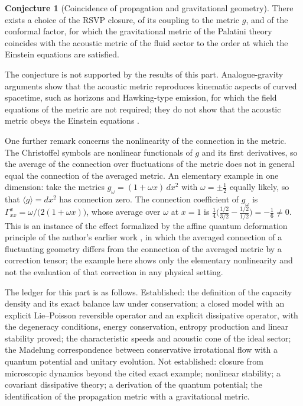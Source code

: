 \documentclass[11pt,oneside]{book}
\theoremstyle{definition}
\newtheorem{conjecture}[theorem]{Conjecture}
\theoremstyle{remark}
\begin{document}
\begin{conjecture}[Coincidence of propagation and gravitational geometry]\label{conj:coincidence}
There exists a choice of the RSVP closure, of its coupling to the metric $g$, and of the conformal factor, for which the gravitational metric of the Palatini theory coincides with the acoustic metric of the fluid sector to the order at which the Einstein equations are satisfied.
\end{conjecture}

The conjecture is not supported by the results of this part. Analogue-gravity arguments show that the acoustic metric reproduces kinematic aspects of curved spacetime, such as horizons and Hawking-type emission, for which the field equations of the metric are not required; they do not show that the acoustic metric obeys the Einstein equations \cite{visser1998}.

One further remark concerns the nonlinearity of the connection in the metric. The Christoffel symbols are nonlinear functionals of $g$ and its first derivatives, so the average of the connection over fluctuations of the metric does not in general equal the connection of the averaged metric. An elementary example in one dimension: take the metrics $g_\omega=(1+\omega x)\,dx^2$ with $\omega=\pm\tfrac12$ equally likely, so that $\langle g\rangle=dx^2$ has connection zero. The connection coefficient of $g_\omega$ is $\Gamma^x_{xx}=\omega/\bigl(2(1+\omega x)\bigr)$, whose average over $\omega$ at $x=1$ is $\tfrac14\bigl(\tfrac{1/2}{3/2}-\tfrac{1/2}{1/2}\bigr)=-\tfrac16\neq0$. This is an instance of the effect formalized by the affine quantum deformation principle of the author's earlier work \cite{flyxion2025aqdp}, in which the averaged connection of a fluctuating geometry differs from the connection of the averaged metric by a correction tensor; the example here shows only the elementary nonlinearity and not the evaluation of that correction in any physical setting.

The ledger for this part is as follows. Established: the definition of the capacity density and its exact balance law under conservation; a closed model with an explicit Lie--Poisson reversible operator and an explicit dissipative operator, with the degeneracy conditions, energy conservation, entropy production and linear stability proved; the characteristic speeds and acoustic cone of the ideal sector; the Madelung correspondence between conservative irrotational flow with a quantum potential and unitary evolution. Not established: closure from microscopic dynamics beyond the cited exact example; nonlinear stability; a covariant dissipative theory; a derivation of the quantum potential; the identification of the propagation metric with a gravitational metric.
\end{document}
